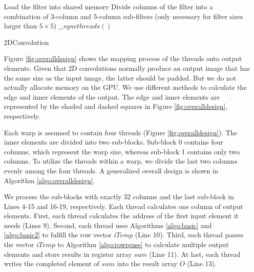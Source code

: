 \begin{algorithm}
	Load the filter into shared memory\;
	Divide columns of the filter into a combination of 3-column and 5-column sub-filters (only necessary for filter sizes larger than $5 \times 5$)\;
	$\_\_syncthreads()$\;
	\caption{2DConvolution}
	\label{algo:overalldesign}
\end{algorithm}

Figure \ref{fig:overalldesign} shows the mapping process of the threads onto output elements. Given that 2D convolutions normally produce an output image that has the same size as the input image, the latter should be padded. But we do not actually allocate memory on the GPU. We use different methods to calculate the edge and inner elements of the output. The edge and inner elements are represented by the shaded and dashed squares in Figure \ref{fig:overalldesign}, respectively.


Each warp is assumed to contain four threads (Figure \ref{fig:overalldesign}). The inner elements are divided into two
sub-blocks. Sub-block 0 contains four columns, which represent the warp size, whereas sub-block 1 contains only two columns. To utilize the threads within a warp, we divide the last two columns evenly among the four threads. A generalized overall design is shown in Algorithm \ref{algo:overalldesign}.

We process the sub-blocks with exactly 32 columns and the last sub-block in Lines 4-15 and 16-19, respectively. Each thread calculates one column of output elements. First, each thread calculates the address of the first input element it needs (Lines 9). Second, each thread uses Algorithms \ref{algo:basic} and \ref{algo:basic2} to fulfill the row vector $iTemp$ (Line 10). Third, each thread passes the
vector $iTemp$ to Algorithm \ref{algo:rowreuse} to calculate multiple output elements and store results in register array $sum$ (Line 11).
At last, each thread writes the completed element of $sum$ into the result array $O$ (Line 13).



